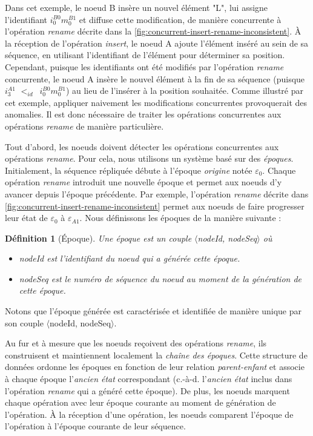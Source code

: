\documentclass[12pt]{thesul}
\newtheorem{definition}{Définition}
\newcommand{\ie}{c.-à-d. }
\newcommand{\trm}[1]{\mathit{#1}}
\newcommand{\id}[3]{$\trm{#1}^{\trm{#2}}_{\trm{#3}}$}
\newcommand{\epoch}[1]{$\varepsilon_{#1}$}
\newcommand{\lid}{$<_{id}$~}
\begin{document}
Dans cet exemple, le noeud B insère un nouvel élément "L", lui assigne l'identifiant \id{i}{B0}{0}\id{m}{B1}{0} et diffuse cette modification, de manière concurrente à l'opération \emph{rename} décrite dans la \autoref{fig:concurrent-insert-rename-inconsistent}.
À la réception de l'opération \emph{insert}, le noeud A ajoute l'élément inséré au sein de sa séquence, en utilisant l'identifiant de l'élément pour déterminer sa position.
Cependant, puisque les identifiants ont été modifiés par l'opération \emph{rename} concurrente, le noeud A insère le nouvel élément à la fin de sa séquence (puisque \id{i}{A1}{3} \lid \id{i}{B0}{0}\id{m}{B1}{0}) au lieu de l'insérer à la position souhaitée.
Comme illustré par cet exemple, appliquer naivement les modifications concurrentes provoquerait des anomalies.
Il est donc nécessaire de traiter les opérations concurrentes aux opérations \emph{rename} de manière particulière.

Tout d'abord, les noeuds doivent détecter les opérations concurrentes aux opérations \emph{rename}.
Pour cela, nous utilisons un système basé sur des \emph{époques}.
Initialement, la séquence répliquée débute à l'époque \emph{origine} notée \epoch{0}.
Chaque opération \emph{rename} introduit une nouvelle époque et permet aux noeuds d'y avancer depuis l'époque précédente.
Par exemple, l'opération \emph{rename} décrite dans \autoref{fig:concurrent-insert-rename-inconsistent} permet aux noeuds de faire progresser leur état de \epoch{0} à \epoch{A1}.
Nous définissons les époques de la manière suivante :

\begin{definition}[Époque]
  Une époque est un couple $\langle$nodeId, nodeSeq$\rangle$ où
  \begin{itemize}
    \item nodeId est l'identifiant du noeud qui a générée cette époque.
    \item nodeSeq est le numéro de séquence du noeud au moment de la génération de cette époque.
  \end{itemize}
\end{definition}

Notons que l'époque générée est caractérisée et identifiée de manière unique par son couple $\langle$nodeId, nodeSeq$\rangle$.

Au fur et à mesure que les noeuds reçoivent des opérations \emph{rename}, ils construisent et maintiennent localement la \emph{chaîne des époques}.
Cette structure de données ordonne les époques en fonction de leur relation \emph{parent-enfant} et associe à chaque époque l'\emph{ancien état} correspondant (\ie l'\emph{ancien état} inclus dans l'opération \emph{rename} qui a généré cette époque).
De plus, les noeuds marquent chaque opération avec leur époque courante au moment de génération de l'opération.
À la réception d'une opération, les noeuds comparent l'époque de l'opération à l'époque courante de leur séquence.
\end{document}
